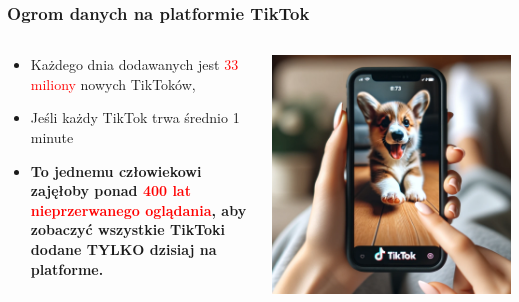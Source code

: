 \documentclass[smaller]{beamer}
\begin{document}
\begin{frame}
\frametitle{Ogrom danych na platformie TikTok}

\begin{columns}
    \begin{column}{0.6\textwidth}
        \begin{itemize}
            \item Każdego dnia dodawanych jest \textcolor{red}{33 miliony} nowych TikToków,
            \item Jeśli każdy TikTok trwa średnio 1 minute
            \item \textbf{To jednemu człowiekowi zajęłoby ponad \textcolor{red}{400 lat nieprzerwanego oglądania}, aby zobaczyć wszystkie TikToki dodane TYLKO dzisiaj na platforme.}
        \end{itemize}
    \end{column}
    
    \begin{column}{0.4\textwidth}
        \includegraphics[width=\textwidth]{../manifest/human-tiktok.png} 
    \end{column}
\end{columns}
\end{frame}

\end{document}
